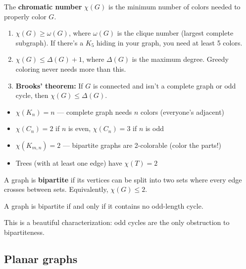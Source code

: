 \begin{definition}
The \textbf{chromatic number} $\chi(G)$ is the minimum number of colors needed to properly color $G$.
\end{definition}

\begin{theorem}
\begin{enumerate}
  \item $\chi(G) \geq \omega(G)$, where $\omega(G)$ is the clique number (largest complete subgraph). If there's a $K_5$ hiding in your graph, you need at least 5 colors.
  \item $\chi(G) \leq \Delta(G) + 1$, where $\Delta(G)$ is the maximum degree. Greedy coloring never needs more than this.
  \item \textbf{Brooks' theorem:} If $G$ is connected and isn't a complete graph or odd cycle, then $\chi(G) \leq \Delta(G)$.
\end{enumerate}
\end{theorem}

\begin{theorem}
\begin{itemize}
  \item $\chi(K_n) = n$ --- complete graph needs $n$ colors (everyone's adjacent)
  \item $\chi(C_n) = 2$ if $n$ is even, $\chi(C_n) = 3$ if $n$ is odd
  \item $\chi(K_{m,n}) = 2$ --- bipartite graphs are 2-colorable (color the parts!)
  \item Trees (with at least one edge) have $\chi(T) = 2$
\end{itemize}
\end{theorem}

\begin{definition}
A graph is \textbf{bipartite} if its vertices can be split into two sets where every edge crosses between sets. Equivalently, $\chi(G) \leq 2$.
\end{definition}

\begin{theorem}
A graph is bipartite if and only if it contains no odd-length cycle.
\end{theorem}

This is a beautiful characterization: odd cycles are the only obstruction to bipartiteness.

\subsection*{Planar graphs}

